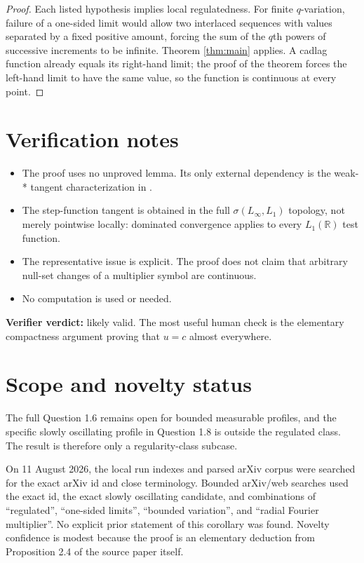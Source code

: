 \documentclass[11pt]{article}
\newcommand{\R}{\mathbb{R}}
\begin{document}
\begin{proof}
Each listed hypothesis implies local regulatedness. For finite
$q$-variation, failure of a one-sided limit would allow two interlaced
sequences with values separated by a fixed positive amount, forcing the sum
of the $q$th powers of successive increments to be infinite. Theorem
\ref{thm:main} applies. A cadlag function already equals its right-hand limit;
the proof of the theorem forces the left-hand limit to have the same value,
so the function is continuous at every point.
\end{proof}

\section{Verification notes}

\begin{itemize}
  \item The proof uses no unproved lemma. Its only external dependency is the
  weak-* tangent characterization in \cite[Theorem~1.7 and Proposition~2.4]
  {delasalle2026}.
  \item The step-function tangent is obtained in the full
  $\sigma(L_\infty,L_1)$ topology, not merely pointwise locally: dominated
  convergence applies to every $L_1(\R)$ test function.
  \item The representative issue is explicit. The proof does not claim that
  arbitrary null-set changes of a multiplier symbol are continuous.
  \item No computation is used or needed.
\end{itemize}

\noindent\textbf{Verifier verdict:} likely valid. The most useful human check
is the elementary compactness argument proving that $u=c$ almost everywhere.

\section{Scope and novelty status}

The full Question 1.6 remains open for bounded measurable profiles, and the
specific slowly oscillating profile in Question 1.8 is outside the regulated
class. The result is therefore only a regularity-class subcase.

On 11 August 2026, the local run indexes and parsed arXiv corpus were searched
for the exact arXiv id and close terminology. Bounded arXiv/web searches used
the exact id, the exact slowly oscillating candidate, and combinations of
``regulated'', ``one-sided limits'', ``bounded variation'', and ``radial
Fourier multiplier''. No explicit prior statement of this corollary was found.
Novelty confidence is modest because the proof is an elementary deduction
from Proposition 2.4 of the source paper itself.
\end{document}
